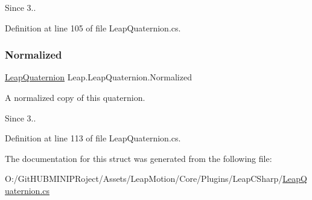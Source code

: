 \begin{DoxySince}{Since}
3.. 
\end{DoxySince}


Definition at line 105 of file Leap\+Quaternion.\+cs.

\mbox{\label{struct_leap_1_1_leap_quaternion_a3d8b362ae5fc430450ea56146f08cce2}} 
\subsubsection{\texorpdfstring{Normalized}{Normalized}}
{\footnotesize\ttfamily \mbox{\hyperlink{struct_leap_1_1_leap_quaternion}{Leap\+Quaternion}} Leap.\+Leap\+Quaternion.\+Normalized\hspace{0.3cm}{\ttfamily [get]}}



A normalized copy of this quaternion. 

\begin{DoxySince}{Since}
3.. 
\end{DoxySince}


Definition at line 113 of file Leap\+Quaternion.\+cs.



The documentation for this struct was generated from the following file\+:\begin{DoxyCompactItemize}
\item 
O\+:/\+Git\+H\+U\+B\+M\+I\+N\+I\+P\+Roject/\+Assets/\+Leap\+Motion/\+Core/\+Plugins/\+Leap\+C\+Sharp/\mbox{\hyperlink{_leap_quaternion_8cs}{Leap\+Quaternion.\+cs}}\end{DoxyCompactItemize}
